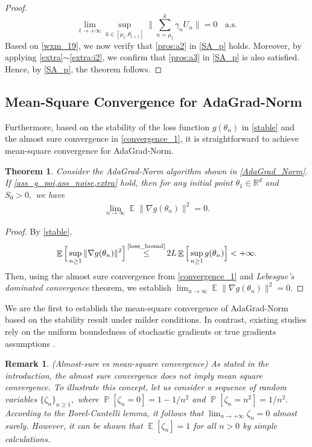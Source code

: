 \documentclass[standalone]{article}
\newtheorem{thm}{Theorem}[section]
\DeclareMathOperator{\Expect}{\mathbb{E}}
\DeclareMathOperator{\pro}{\mathbb{P}}
\newtheorem{rem}{Remark}
\begin{document}
\begin{proof}
\[\lim_{t\rightarrow+\infty}\sup_{k\in[\mu_{t}, \theta_{t+1}]}\Bigg\|\sum_{n=\mu_{t}}^{k}\gamma_{n}U_{n}\Bigg\|=0\ \ \ \ \text{a.s.}\]
Based on \cref{wxm_19}, we now verify that \cref{pros:a2} in \cref{SA_p} holds. Moreover, by applying \cref{extra}$\sim$\cref{extra:i2}, we confirm that \cref{pros:a3} in \cref{SA_p} is also satisfied. Hence, by \cref{SA_p}, the theorem follows. 
\end{proof}

\subsection{Mean-Square Convergence for AdaGrad-Norm}\label{sec:mean:convergence}
Furthermore, based on the stability of the loss function $g(\theta_n)$ in \cref{stable} and the almost sure convergence in \cref{convergence_1}, it is straightforward to achieve mean-square convergence for AdaGrad-Norm.
\begin{thm}\label{convergence_2}
Consider the AdaGrad-Norm algorithm shown in  \cref{AdaGrad_Norm}. If \cref{ass_g_poi,ass_noise,extra} hold, then for any initial point $ \theta_{1}\in \mathbb{R}^{d}$ and $S_{0}>0,$  we have
\begin{equation}\nonumber\begin{aligned}
\lim_{n\rightarrow\infty}\Expect\|\nabla g(\theta_{n})\|^{2}=0.
\end{aligned}\end{equation}
\end{thm}
 \begin{proof}
By \cref{stable},
\[\Expect\Big[\sup_{n\ge 1}\|\nabla g(\theta_{n})\|^{2}\Big]   \mathop{\le}^{\text{\cref{loss_bound}}} 2 L\Expect\Big[\sup_{n\ge 1}g(\theta_{n})\Big]<+\infty.\]
Then, using the almost sure convergence from \cref{convergence_1} and \emph{Lebesgue's dominated convergence} theorem, we establish \(\lim_{n\rightarrow\infty}\Expect\|\nabla g(\theta_{n})\|^{2}=0.\) 
 \end{proof}
We are the first to establish the mean-square convergence of AdaGrad-Norm based on the stability result under milder conditions. In contrast, existing studies rely on the uniform boundedness of stochastic gradients or true gradients assumptions \citep{JMLR:v25:23-0576,mertikopoulos2020almost}. 

\begin{rem}(Almost-sure vs mean-square convergence)
As stated in the introduction, the almost sure convergence does not imply mean square convergence. To illustrate this concept, let us consider a sequence of random variables $\{\zeta_{n}\}_{n\ge 1},$ where $\pro[\zeta_{n}=0]=1-1/n^{2}$ and $\pro[\zeta_{n}=n^{2}]=1/n^{2}.$ According to \textit{the Borel-Cantelli lemma}, it follows that $\lim_{n\rightarrow+\infty}\zeta_{n}=0$ almost surely. However, it can be shown that $\Expect[\zeta_{n}]=1$ for all $n>0$ by simple calculations.
\end{rem}
\end{document}
